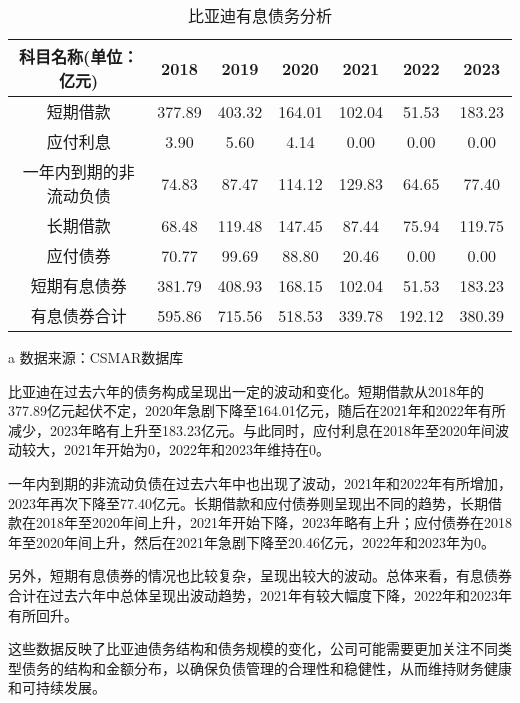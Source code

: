 \begin{table}
  \centering
  \begin{threeparttable}[c]
    \caption{比亚迪有息债务分析}
    \label{tab:debt-with-interest}
    \begin{tabular}{ccccccc}
      \toprule
        科目名称(单位：亿元) & 2018 & 2019 & 2020 & 2021 & 2022 & 2023 \\ 
      \midrule
        短期借款 & 377.89  & 403.32  & 164.01  & 102.04  & 51.53  & 183.23  \\ 
        应付利息 & 3.90  & 5.60  & 4.14  & 0.00  & 0.00  & 0.00  \\ 
        一年内到期的非流动负债 & 74.83  & 87.47  & 114.12  & 129.83  & 64.65  & 77.40  \\ 
        长期借款 & 68.48  & 119.48  & 147.45  & 87.44  & 75.94  & 119.75  \\ 
        应付债券 & 70.77  & 99.69  & 88.80  & 20.46  & 0.00  & 0.00  \\ 
        短期有息债券 & 381.79  & 408.93  & 168.15  & 102.04  & 51.53  & 183.23  \\ 
        有息债券合计 & 595.86  & 715.56  & 518.53  & 339.78  & 192.12  & 380.39 \\ 
      \bottomrule
    \end{tabular}
    \begin{tablenotes}
      \item [a] 数据来源：CSMAR数据库
    \end{tablenotes}
  \end{threeparttable}
\end{table}

比亚迪在过去六年的债务构成呈现出一定的波动和变化。短期借款从2018年的377.89亿元起伏不定，2020年急剧下降至164.01亿元，随后在2021年和2022年有所减少，2023年略有上升至183.23亿元。与此同时，应付利息在2018年至2020年间波动较大，2021年开始为0，2022年和2023年维持在0。

一年内到期的非流动负债在过去六年中也出现了波动，2021年和2022年有所增加，2023年再次下降至77.40亿元。长期借款和应付债券则呈现出不同的趋势，长期借款在2018年至2020年间上升，2021年开始下降，2023年略有上升；应付债券在2018年至2020年间上升，然后在2021年急剧下降至20.46亿元，2022年和2023年为0。

另外，短期有息债券的情况也比较复杂，呈现出较大的波动。总体来看，有息债券合计在过去六年中总体呈现出波动趋势，2021年有较大幅度下降，2022年和2023年有所回升。

这些数据反映了比亚迪债务结构和债务规模的变化，公司可能需要更加关注不同类型债务的结构和金额分布，以确保负债管理的合理性和稳健性，从而维持财务健康和可持续发展。
